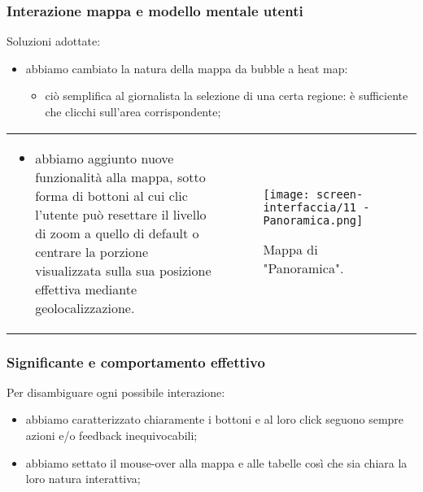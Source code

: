 \begin{frame}
    \frametitle{Interazione mappa e modello mentale utenti}
    \label{f:mappa}
    Soluzioni adottate: 
    \begin{itemize}
        \item abbiamo cambiato la natura della mappa da bubble a heat map:
        \begin{itemize}
            \item ciò semplifica al giornalista la selezione di una certa regione: è sufficiente che clicchi sull'area corrispondente;
        \end{itemize}
    \end{itemize}
    \hspace{-8pt}
    \begin{tabular}{p{}p{}}    
        \begin{itemize}
            \item abbiamo aggiunto nuove funzionalità alla mappa, sotto forma di bottoni al cui clic l'utente può resettare il livello di zoom a quello di default o centrare la porzione visualizzata sulla sua posizione effettiva mediante geolocalizzazione.
        \end{itemize} &
            
        \begin{figure}
            \centering
            \vspace{-20pt}
            \texttt{[image: screen-interfaccia/11 - Panoramica.png]}
            \caption{Mappa di "Panoramica".}
        \end{figure} \\

    \end{tabular}   

\end{frame}


\begin{frame}
    \frametitle{Significante e comportamento effettivo}
    \label{f:significante}
    Per disambiguare ogni possibile interazione:
    \begin{itemize}
        \item<1-> abbiamo caratterizzato chiaramente i bottoni e al loro click seguono sempre azioni e/o feedback inequivocabili;
        \item<2-> abbiamo settato il mouse-over alla mappa e alle tabelle così che sia chiara la loro natura interattiva;
    \end{itemize}
\end{frame}

